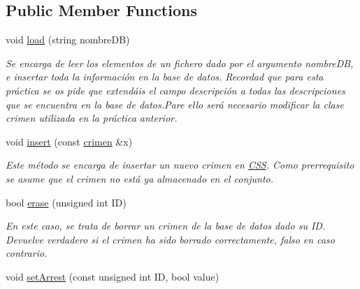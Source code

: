 \subsection*{Public Member Functions}
\begin{DoxyCompactItemize}
\item 
\hypertarget{classCSS_ab46659bd53bb62d63ca4d9a6e66432eb}{}void \hyperlink{classCSS_ab46659bd53bb62d63ca4d9a6e66432eb}{load} (string nombre\+D\+B)\label{classCSS_ab46659bd53bb62d63ca4d9a6e66432eb}

\begin{DoxyCompactList}\small\item\em Se encarga de leer los elementos de un fichero dado por el argumento nombre\+D\+B, e insertar toda la información en la base de datos. Recordad que para esta práctica se os pide que extendáis el campo descripción a todas las descripciones que se encuentra en la base de datos.\+Pare ello será necesario modificar la clase crimen utilizada en la práctica anterior. \end{DoxyCompactList}\item 
\hypertarget{classCSS_aa91d167f48777dee663cc04ecdfbbf94}{}void \hyperlink{classCSS_aa91d167f48777dee663cc04ecdfbbf94}{insert} (const \hyperlink{classcrimen}{crimen} \&x)\label{classCSS_aa91d167f48777dee663cc04ecdfbbf94}

\begin{DoxyCompactList}\small\item\em Este método se encarga de insertar un nuevo crimen en \hyperlink{classCSS}{C\+S\+S}. Como prerrequisito se asume que el crimen no está ya almacenado en el conjunto. \end{DoxyCompactList}\item 
\hypertarget{classCSS_a2c783f8e37c103cf317c2fd11864a796}{}bool \hyperlink{classCSS_a2c783f8e37c103cf317c2fd11864a796}{erase} (unsigned int I\+D)\label{classCSS_a2c783f8e37c103cf317c2fd11864a796}

\begin{DoxyCompactList}\small\item\em En este caso, se trata de borrar un crimen de la base de datos dado su I\+D. Devuelve verdadero si el crimen ha sido borrado correctamente, falso en caso contrario. \end{DoxyCompactList}\item 
\hypertarget{classCSS_ae63486750a33cba9bb04d07a308bfbbb}{}void \hyperlink{classCSS_ae63486750a33cba9bb04d07a308bfbbb}{set\+Arrest} (const unsigned int I\+D, bool value)\label{classCSS_ae63486750a33cba9bb04d07a308bfbbb}


\end{DoxyCompactItemize}
